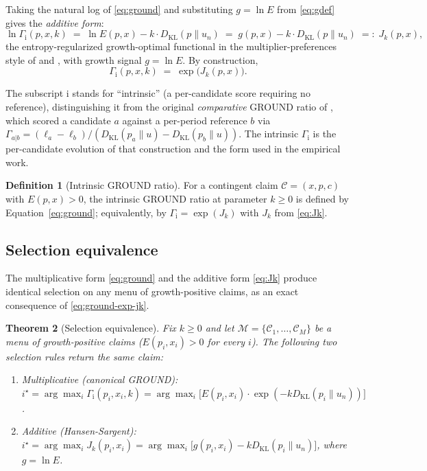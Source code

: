 \documentclass[11pt]{article}
\newtheorem{theorem}{Theorem}
\theoremstyle{definition}
\newtheorem{definition}[theorem]{Definition}
\theoremstyle{remark}
\newcommand{\C}{\mathcal{C}}
\newcommand{\G}{g}
\newcommand{\KL}{D_{\mathrm{KL}}}
\newcommand{\GROUND}{\Gamma_{\mathrm{i}}}
\begin{document}
Taking the natural log of \eqref{eq:ground} and substituting
$\G = \ln E$ from \eqref{eq:gdef} gives the \emph{additive form}:
\begin{equation}
\ln \GROUND(p, x, k) \;=\; \ln E(p, x) - k \cdot \KL(p \| u_n)
                       \;=\; \G(p, x) - k \cdot \KL(p \| u_n)
                       \;=:\; J_k(p, x),
\label{eq:Jk}
\end{equation}
the entropy-regularized growth-optimal functional in the
multiplier-preferences style of \citet{hansen2008robustness} and
\citet{maccheroni2006ambiguity}, with growth signal $\G = \ln E$.
By construction,
\begin{equation}
\GROUND(p, x, k) \;=\; \exp\!\bigl(J_k(p, x)\bigr).
\label{eq:ground-exp-jk}
\end{equation}

The subscript $\mathrm{i}$ stands for ``intrinsic'' (a per-candidate
score requiring no reference), distinguishing it from the original
\emph{comparative} GROUND ratio of \citet{mercurio2020}, which scored
a candidate $a$ against a per-period reference $b$ via
$\Gamma_{a|b} = (\ell_a - \ell_b) / (\KL(p_a\|u) - \KL(p_b\|u))$. The
intrinsic $\GROUND$ is the per-candidate evolution of that
construction and the form used in the empirical work.

\begin{definition}[Intrinsic GROUND ratio]\label{def:ground}
For a contingent claim $\C = (x, p, c)$ with $E(p, x) > 0$, the
intrinsic GROUND ratio at parameter $k \ge 0$ is defined by
Equation~\eqref{eq:ground}; equivalently, by $\GROUND = \exp(J_k)$
with $J_k$ from \eqref{eq:Jk}.
\end{definition}

\subsection{Selection equivalence}\label{sec:hs-link}

The multiplicative form \eqref{eq:ground} and the additive form
\eqref{eq:Jk} produce identical selection on any menu of
growth-positive claims, as an exact consequence of
\eqref{eq:ground-exp-jk}.

\begin{theorem}[Selection equivalence]\label{thm:main}
Fix $k \ge 0$ and let $\mathcal{M} = \{\C_1, \ldots, \C_M\}$ be a
menu of growth-positive claims ($E(p_i, x_i) > 0$ for every $i$).
The following two selection rules return the same claim:
\begin{enumerate}
    \item Multiplicative (canonical GROUND): $i^\star = \arg\max_{i}
          \GROUND(p_i, x_i, k) = \arg\max_i \bigl[ E(p_i, x_i) \cdot
          \exp(-k \KL(p_i \| u_n)) \bigr]$.
    \item Additive (Hansen-Sargent): $i^\star = \arg\max_{i}
          J_k(p_i, x_i) = \arg\max_i \bigl[ \G(p_i, x_i) - k \KL(p_i \|
          u_n) \bigr]$, where $\G = \ln E$.
\end{enumerate}
\end{theorem}
\end{document}
